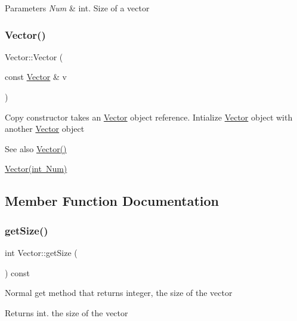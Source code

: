 \begin{DoxyParams}{Parameters}
{\em Num} & int. Size of a vector \\
\hline
\end{DoxyParams}
\mbox{\label{classVector_a5f04e343b7306ad11f8a82c89b486764}} 
\subsubsection{\texorpdfstring{Vector()}{Vector()}\hspace{0.1cm}{\footnotesize\ttfamily [3/3]}}
{\footnotesize\ttfamily Vector\+::\+Vector (\begin{DoxyParamCaption}\item[{const \mbox{\hyperlink{classVector}{Vector}} \&}]{v }\end{DoxyParamCaption})}

Copy constructor takes an \mbox{\hyperlink{classVector}{Vector}} object reference. Intialize \mbox{\hyperlink{classVector}{Vector}} object with another \mbox{\hyperlink{classVector}{Vector}} object \begin{DoxySeeAlso}{See also}
\mbox{\hyperlink{classVector_a6f80c73b5f18dcf3f8e36065bdc8b9e5}{Vector()}} 

\mbox{\hyperlink{classVector_acbdf66550f2caa0a64e0b356fb63a277}{Vector(int Num)}} 
\end{DoxySeeAlso}


\subsection{Member Function Documentation}
\mbox{\label{classVector_afbb7966ec4107c43ec15cccc47fcaef7}} 
\subsubsection{\texorpdfstring{get\+Size()}{getSize()}}
{\footnotesize\ttfamily int Vector\+::get\+Size (\begin{DoxyParamCaption}{ }\end{DoxyParamCaption}) const}

Normal get method that returns integer, the size of the vector \begin{DoxyReturn}{Returns}
int. the size of the vector 
\end{DoxyReturn}
\mbox{\label{classVector_a6752a90058ddef427ca6aed12946a737}} 
